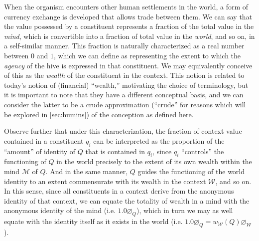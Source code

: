 \documentclass[pra,twocolumn,groupedaddress,10pt]{revtex4}
\theoremstyle{definition}
\begin{document}
When the organism encounters other human settlements in the world, a form of currency exchange is developed that allows trade between them. We can say that the value possessed by a constituent represents a fraction of the total value in the \textit{mind}, which is convertible into a fraction of total value in the \textit{world}, and so on, in a self-similar manner. This fraction is naturally characterized as a real number between $0$ and $1$, which we can define as representing the extent to which the \textit{agency} of the hive is expressed in that constituent. We may equivalently conceive of this as the \textit{wealth} of the constituent in the context. This notion is related to today's notion of (financial) ``wealth,'' motivating the choice of terminology, but it is important to note that they have a different conceptual basis, and we can consider the latter to be a crude approximation (``crude'' for reasons which will be explored in \autoref{sec:humins}) of the conception as defined here.

Observe further that under this characterization, the fraction of context value contained in a constituent $q_i$ can be interpreted as the proportion of the ``amount'' of identity of $Q$ that is contained in $q_{i}$, since $q_{i}$ ``controls'' the functioning of $Q$ in the world precisely to the extent of its own wealth within the mind $\mathcal{M}$ of $Q$. And in the same manner, $Q$ guides the functioning of the world identity to an extent commensurate with its wealth in the context $\mathcal{W}$, and so on. In this sense, since all constituents in a context derive from the anonymous identity of that context, we can equate the totality of wealth in a mind with the anonymous identity of the mind (i.e. $1.0 \varnothing_Q$), which in turn we may as well equate with the identity itself as it exists in the world (i.e. $1.0 \varnothing_Q = w_{\mathcal{W}}(Q) \varnothing_{\mathcal{W}}$).
\end{document}
